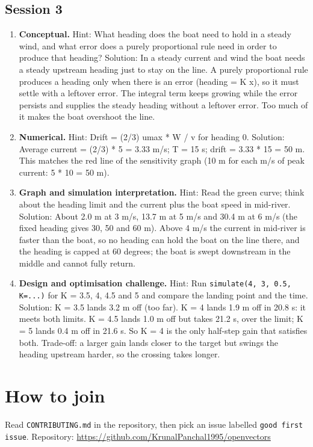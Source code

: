 \documentclass[11pt,a4paper]{article}
\begin{document}
\subsection*{Session 3}
\begin{enumerate}[nosep]
\item \textbf{Conceptual.} Hint: What heading does the boat need to hold in a steady wind, and what error does a purely proportional rule need in order to produce that heading? Solution: In a steady current and wind the boat needs a steady upstream heading just to stay on the line. A purely proportional rule produces a heading only when there is an error (heading = K x), so it must settle with a leftover error. The integral term keeps growing while the error persists and supplies the steady heading without a leftover error. Too much of it makes the boat overshoot the line.
\item \textbf{Numerical.} Hint: Drift = (2/3) umax * W / v for heading 0. Solution: Average current = (2/3) * 5 = 3.33 m/s; T = 15 s; drift = 3.33 * 15 = 50 m. This matches the red line of the sensitivity graph (10 m for each m/s of peak current: 5 * 10 = 50 m).
\item \textbf{Graph and simulation interpretation.} Hint: Read the green curve; think about the heading limit and the current plus the boat speed in mid-river. Solution: About 2.0 m at 3 m/s, 13.7 m at 5 m/s and 30.4 m at 6 m/s (the fixed heading gives 30, 50 and 60 m). Above 4 m/s the current in mid-river is faster than the boat, so no heading can hold the boat on the line there, and the heading is capped at 60 degrees; the boat is swept downstream in the middle and cannot fully return.
\item \textbf{Design and optimisation challenge.} Hint: Run \texttt{simulate(4, 3, 0.5, K=...)} for K = 3.5, 4, 4.5 and 5 and compare the landing point and the time. Solution: K = 3.5 lands 3.2 m off (too far). K = 4 lands 1.9 m off in 20.8 s: it meets both limits. K = 4.5 lands 1.0 m off but takes 21.2 s, over the limit; K = 5 lands 0.4 m off in 21.6 s. So K = 4 is the only half-step gain that satisfies both. Trade-off: a larger gain lands closer to the target but swings the heading upstream harder, so the crossing takes longer.
\end{enumerate}

\section{How to join}
Read \texttt{CONTRIBUTING.md} in the repository, then pick an issue labelled \texttt{good first issue}. Repository: \url{https://github.com/KrunalPanchal1995/openvectors}
\end{document}

